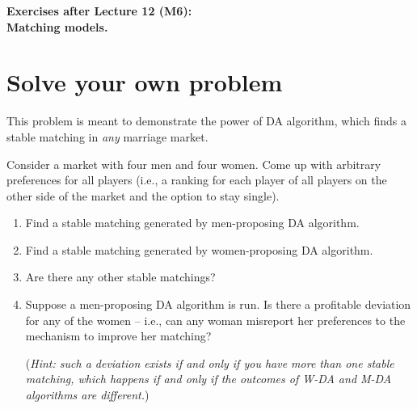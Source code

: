 \documentclass[a4paper]{article}
\newif\ifsolutions
\begin{document}
\begin{center}
		\LARGE\textbf{Exercises after Lecture 12 (M6):\\ Matching models.}
\end{center}



\section{Solve your own problem}
	
	This problem is meant to demonstrate the power of DA algorithm, which finds a stable matching in \emph{any} marriage market. 
	
	Consider a market with four men and four women. Come up with arbitrary preferences for all players (i.e., a ranking for each player of all players on the other side of the market and the option to stay single).
	\begin{enumerate}
		\item Find a stable matching generated by men-proposing DA algorithm.
		\item Find a stable matching generated by women-proposing DA algorithm.
		\item Are there any other stable matchings?
		\item Suppose a men-proposing DA algorithm is run. Is there a profitable deviation for any of the women -- i.e., can any woman misreport her preferences to the mechanism to improve her matching? 
		
		(\emph{Hint: such a deviation exists if and only if you have more than one stable matching, which happens if and only if the outcomes of W-DA and M-DA algorithms are different.})
	\end{enumerate}
	
	
\ifsolutions
\end{document}
